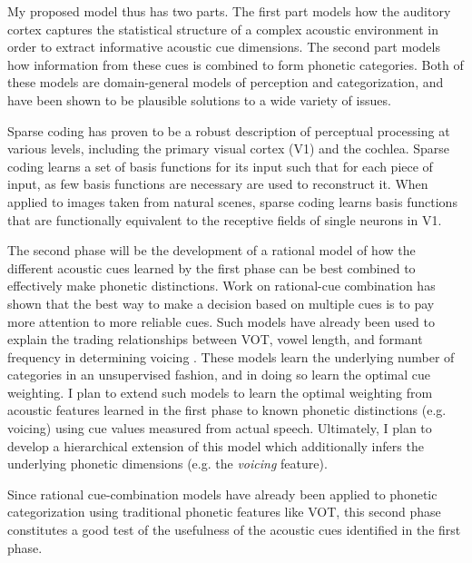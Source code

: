 \documentclass[12pt]{article}
\begin{document}
My proposed model thus has two parts.  The first part models how the auditory cortex captures the statistical structure of a complex acoustic environment in order to extract informative acoustic cue dimensions.  The second part models how information from these cues is combined to form phonetic categories.  Both of these models are domain-general models of perception and categorization, and have been shown to be plausible solutions to a wide variety of issues.

Sparse coding \cite{Olshausen1996} has proven to be a robust description of perceptual processing at various levels, including the primary visual cortex (V1) and the cochlea.  Sparse coding learns a set of basis functions for its input such that for each piece of input, as few basis functions are necessary are used to reconstruct it.  When applied to images taken from natural scenes, sparse coding learns basis functions that are functionally equivalent to the receptive fields of single neurons in V1.  


The second phase will be the development of a rational model of how the different acoustic cues learned by the first phase can be best combined to effectively make phonetic distinctions.  Work on rational-cue combination has shown that the best way to make a decision based on multiple cues is to pay more attention to more reliable cues.  Such models have already been used to explain the trading relationships between VOT, vowel length, and formant frequency in determining voicing \cite{Toscano2008}.  These models learn the underlying number of categories in an unsupervised fashion, and in doing so learn the optimal cue weighting.  I plan to extend such models to learn the optimal weighting from acoustic features learned in the first phase to known phonetic distinctions (e.g. voicing) using cue values measured from actual speech.  
Ultimately, I plan to develop a hierarchical extension of this model which additionally infers the underlying phonetic dimensions (e.g. the \emph{voicing} feature).

Since rational cue-combination models have already been applied to phonetic categorization using traditional phonetic features like VOT, this second phase constitutes a good test of the usefulness of the acoustic cues identified in the first phase.  
\end{document}
